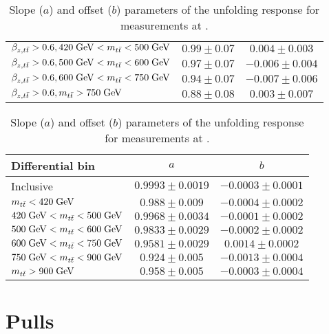 \begin{table}[htbp]
\begin{center}
\begin{tabular}{l c c}
      $\beta_{z,t\bar{t}}{}>0.6, 420\; \mathrm{GeV}{}<m_{t\bar{t}}{}<500\; \mathrm{GeV}{}$& $0.99\pm0.07$  & $0.004\pm0.003$  \\
      $\beta_{z,t\bar{t}}{}>0.6, 500\; \mathrm{GeV}{}<m_{t\bar{t}}{}<600\; \mathrm{GeV}{}$& $0.97\pm0.07$  & $-0.006\pm0.004$\\
      $\beta_{z,t\bar{t}}{}>0.6, 600\; \mathrm{GeV}{}<m_{t\bar{t}}{}<750\; \mathrm{GeV}{}$& $0.94\pm0.07$ & $-0.007\pm0.006$\\
      $\beta_{z,t\bar{t}}{}>0.6, m_{t\bar{t}}{} >750\; \mathrm{GeV}{}$& $0.88\pm0.08$ & $0.003\pm0.007$\\
      \bottomrule
     \end{tabular}
   \end{center}
  \caption{Slope ($a$) and offset ($b$) parameters of the unfolding
    response for measurements at \seventev{}.}
  \label{tab:unf:response7tev}
\end{table}

\begin{table}[htbp]
  \begin{center}
    \begin{tabular}{l c c}
      \toprule
      Differential bin & $a$ & $b$ \\
      \midrule
      Inclusive & $0.9993\pm0.0019$ & $-0.0003\pm0.0001$\\
      \midrule
      $m_{t\bar{t}}{}<420\; \mathrm{GeV}{}$                & $0.988\pm0.009$  & $-0.0004\pm0.0002$\\
      $420\; \mathrm{GeV}{}<m_{t\bar{t}}{}<500\; \mathrm{GeV}{}$& $0.9968\pm0.0034$  & $-0.0001\pm0.0002$  \\
      $500\; \mathrm{GeV}{}<m_{t\bar{t}}{}<600\; \mathrm{GeV}{}$& $0.9833\pm0.0029$  & $-0.0002\pm0.0002$\\
      $600\; \mathrm{GeV}{}<m_{t\bar{t}}{}<750\; \mathrm{GeV}{}$& $0.9581\pm0.0029$ & $0.0014\pm0.0002$\\
      $750\; \mathrm{GeV}{}<m_{t\bar{t}}{}<900\; \mathrm{GeV}{}$& $0.924\pm0.005$ & $-0.0013\pm0.0004$\\
      $m_{t\bar{t}}{}>900\; \mathrm{GeV}{}$                & $0.958\pm0.005$ & $-0.0003\pm0.0004$\\
      \bottomrule
     \end{tabular}
   \end{center}
  \caption{Slope ($a$) and offset ($b$) parameters of the unfolding
    response for measurements at \eighttev{}.}
  \label{tab:unf:response8tev}
\end{table}

\section{Pulls}
\label{app:unfolding:pulls}

